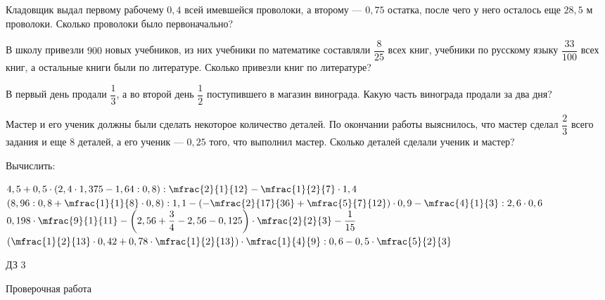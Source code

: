 \begin{homework}[number=2]
	\begin{listofex}
		\item Кладовщик выдал первому рабочему \(0,4\) всей имевшейся проволоки, а второму --- \(0,75\) остатка, после чего у него осталось еще \(28,5\) м проволоки. Сколько проволоки было первоначально?
		\item В школу привезли \(900\) новых учебников, из них учебники по математике составляли \(\dfrac{8}{25}\) всех книг, учебники по русскому языку \(\dfrac{33}{100}\) всех книг, а остальные книги были по литературе. Сколько привезли книг по литературе?
		\item В первый день продали \(\dfrac{1}{3}\), а во второй день \(\dfrac{1}{2}\) поступившего в магазин винограда. Какую часть винограда продали за два дня?
		\item Мастер и его ученик должны были сделать некоторое количество деталей. По окончании работы выяснилось, что мастер сделал \(\dfrac{2}{3}\) всего задания и еще \(8\) деталей, а его ученик --- \(0,25\) того, что выполнил мастер. Сколько деталей сделали ученик и мастер?
		\item Вычислить:
		\begin{itasks}[1]
			\task \( 4,5 + 0,5 \cdot (2,4 \cdot 1,375 - 1,64 : 0,8) : \mfrac{2}{1}{12} - \mfrac{1}{2}{7} \cdot 1,4 \)
			\task \( \left(  8,96 : 0,8 + \mfrac{1}{1}{8} \cdot 0,8 \right) : 1,1 - \left( - \mfrac{2}{17}{36} + \mfrac{5}{7}{12} \right) \cdot 0,9 - \mfrac{4}{1}{3} : 2,6 \cdot 0,6 \)
			\task \( 0,198 \cdot \mfrac{9}{1}{11} - \left(  2,56 + \dfrac{3}{4} - 2,56 - 0,125 \right) \cdot \mfrac{2}{2}{3} - \dfrac{1}{15} \)
			\task \( \left( \mfrac{1}{2}{13} \cdot 0,42 + 0,78 \cdot \mfrac{1}{2}{13} \right) \cdot \mfrac{1}{4}{9} : 0,6 - 0,5 \cdot \mfrac{5}{2}{3} \)
		\end{itasks}
	\end{listofex}
\end{homework}

\begin{homework}[number=3]
	\begin{listofex}
		\item ДЗ 3
	\end{listofex}
\end{homework}

\begin{exam}
	\begin{listofex}
		\item Проверочная работа
	\end{listofex}
\end{exam}
